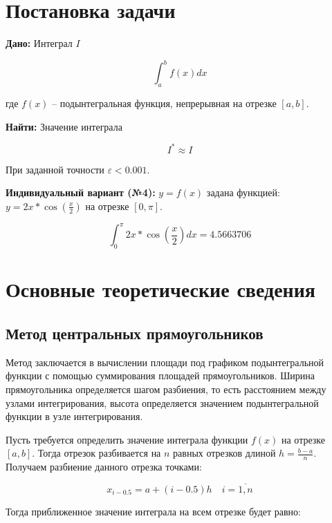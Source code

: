 \documentclass[a4paper, 14pt]{extarticle}
\begin{document}


\renewcommand{\ttdefault}{pcr}

\setlength{\tabcolsep}{3pt}



\newpage
\setcounter{page}{2}



\section{Постановка задачи}

\textbf{Дано:} Интеграл $I$

\[
\int_{a}^{b} f(x)dx
\]

где $f(x)$ -- подынтегральная функция, непрерывная на отрезке $[a, b]$.

\textbf{Найти:} Значение интеграла

\[
I^* \approx I
\]

При заданной точности $\varepsilon < 0.001$.

\textbf{Индивидуальный вариант (№4):} \( y = f(x) \) задана функцией: \( y = 2x * \cos(\frac{x}{2}) \) на отрезке \([0, \pi]\).

\[
\int_{0}^{\pi} 2x * \cos(\frac{x}{2})dx = 4.5663706
\]

\section{Основные теоретические сведения}

\subsection{Метод центральных прямоугольников}
Метод заключается в вычислении площади под графиком подынтегральной функции 
с помощью суммирования площадей прямоугольников. Ширина прямоугольника определяется 
шагом разбиения, то есть расстоянием между узлами интегрирования, высота определяется значением 
подынтегральной функции в узле интегрирования.

Пусть требуется определить значение интеграла функции $f(x)$ на отрезке $[a, b]$. 
Тогда отрезок разбивается на $n$ равных отрезков длиной $h = \frac{b-a}{n}$. 
Получаем разбиение данного отрезка точками:

\[
x_{i-0.5} = a + (i - 0.5)h \quad i = \overline{1,n}
\]

Тогда приближенное значение интеграла на всем отрезке будет равно:
\end{document}
